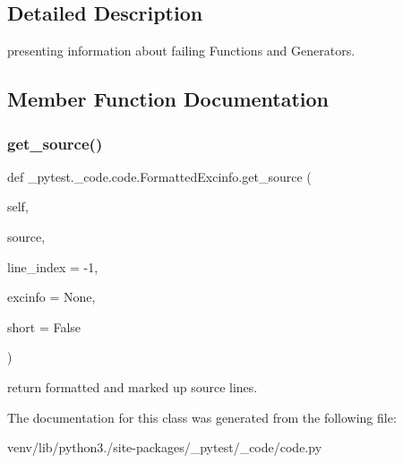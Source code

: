 \subsection{Detailed Description}
\begin{DoxyVerb}presenting information about failing Functions and Generators. \end{DoxyVerb}
 

\subsection{Member Function Documentation}
\mbox{\label{class__pytest_1_1__code_1_1code_1_1_formatted_excinfo_ac48788018b7dabd02316916b29d09ea6}} 
\subsubsection{\texorpdfstring{get\+\_\+source()}{get\_source()}}
{\footnotesize\ttfamily def \+\_\+pytest.\+\_\+code.\+code.\+Formatted\+Excinfo.\+get\+\_\+source (\begin{DoxyParamCaption}\item[{}]{self,  }\item[{}]{source,  }\item[{}]{line\+\_\+index = {\ttfamily -\/1},  }\item[{}]{excinfo = {\ttfamily None},  }\item[{}]{short = {\ttfamily False} }\end{DoxyParamCaption})}

\begin{DoxyVerb}return formatted and marked up source lines. \end{DoxyVerb}
 

The documentation for this class was generated from the following file\+:\begin{DoxyCompactItemize}
\item 
venv/lib/python3./site-\/packages/\+\_\+pytest/\+\_\+code/code.\+py\end{DoxyCompactItemize}
